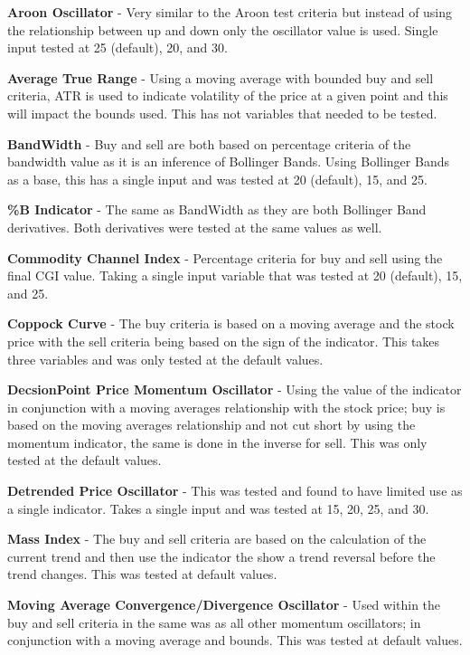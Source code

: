 \documentclass[conference]{IEEEtran}
\begin{document}
\textbf{Aroon Oscillator} - Very similar to the Aroon test criteria but instead of using the relationship between up and down only the oscillator value is used. Single input tested at 25 (default), 20, and 30.

\textbf{Average True Range} - Using a moving average with bounded buy and sell criteria, ATR is used to indicate volatility of the price at a given point and this will impact the bounds used. This has not variables that needed to be tested. 

\textbf{BandWidth} - Buy and sell are both based on percentage criteria of the bandwidth value as it is an inference of Bollinger Bands. Using Bollinger Bands as a base, this has a single input and was tested at 20 (default), 15, and 25.

\textbf{\%B Indicator} - The same as BandWidth as they are both Bollinger Band derivatives. Both derivatives were tested at the same values as well.

\textbf{Commodity Channel Index} - Percentage criteria for buy and sell using the final CGI value. Taking a single input variable that was tested at 20 (default), 15, and 25.

\textbf{Coppock Curve} - The buy criteria is based on a moving average and the stock price with the sell criteria being based on the sign of the indicator. This takes three variables and was only tested at the default values.

\textbf{DecsionPoint Price Momentum Oscillator} - Using the value of the indicator in conjunction with a moving averages relationship with the stock price; buy is based on the moving averages relationship and not cut short by using the momentum indicator, the same is done in the inverse for sell. This was only tested at the default values.

\textbf{Detrended Price Oscillator} - This was tested and found to have limited use as a single indicator. Takes a single input and was tested at 15, 20, 25, and 30.

\textbf{Mass Index} - The buy and sell criteria are based on the calculation of the current trend and then use the indicator the show a trend reversal before the trend changes. This was tested at default values.

\textbf{Moving Average Convergence/Divergence Oscillator} - Used within the buy and sell criteria in the same was as all other momentum oscillators; in conjunction with a moving average and bounds. This was tested at default values.
\end{document}
